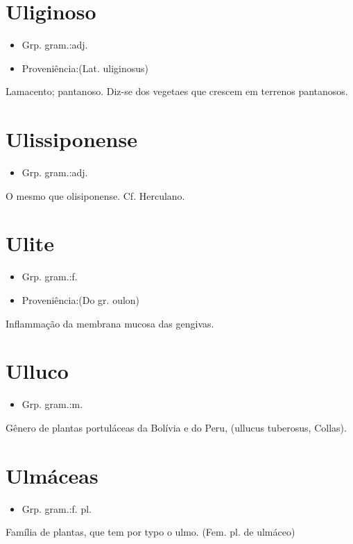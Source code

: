 \documentclass{article}
\begin{document}
\section{Uliginoso}
\begin{itemize}
\item {Grp. gram.:adj.}
\end{itemize}
\begin{itemize}
\item {Proveniência:(Lat. \textunderscore uliginosus\textunderscore )}
\end{itemize}
Lamacento; pantanoso.
Diz-se dos vegetaes que crescem em terrenos pantanosos.
\section{Ulissiponense}
\begin{itemize}
\item {Grp. gram.:adj.}
\end{itemize}
O mesmo que \textunderscore olisiponense\textunderscore . Cf. Herculano.
\section{Ulite}
\begin{itemize}
\item {Grp. gram.:f.}
\end{itemize}
\begin{itemize}
\item {Proveniência:(Do gr. \textunderscore oulon\textunderscore )}
\end{itemize}
Inflammação da membrana mucosa das gengivas.
\section{Ulluco}
\begin{itemize}
\item {Grp. gram.:m.}
\end{itemize}
Gênero de plantas portuláceas da Bolívia e do Peru, (\textunderscore ullucus tuberosus\textunderscore , Collas).
\section{Ulmáceas}
\begin{itemize}
\item {Grp. gram.:f. pl.}
\end{itemize}
Família de plantas, que tem por typo o ulmo.
(Fem. pl. de \textunderscore ulmáceo\textunderscore )
\end{document}
